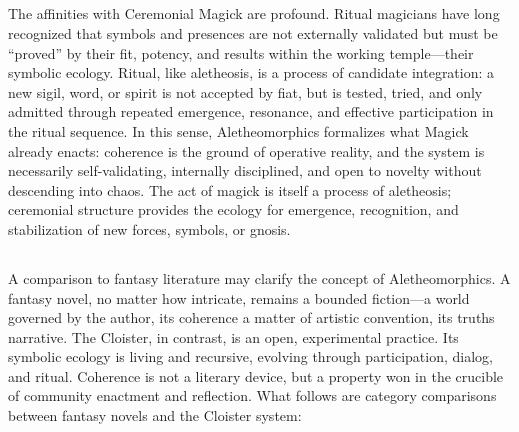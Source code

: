 \subsection*{}

The affinities with Ceremonial Magick are profound. Ritual magicians have long
recognized that symbols and presences are not externally validated but must be
“proved” by their fit, potency, and results within the working temple—their
symbolic ecology. Ritual, like aletheosis, is a process of candidate
integration: a new sigil, word, or spirit is not accepted by fiat, but is
tested, tried, and only admitted through repeated emergence, resonance, and
effective participation in the ritual sequence. In this sense, Aletheomorphics
formalizes what Magick already enacts: coherence is the ground of operative
reality, and the system is necessarily self-validating, internally disciplined,
and open to novelty without descending into chaos. The act of magick is itself
a process of aletheosis; ceremonial structure provides the ecology for
emergence, recognition, and stabilization of new forces, symbols, or gnosis.

\subsection*{}

A comparison to fantasy literature may clarify the concept of Aletheomorphics.
A fantasy novel, no matter how intricate, remains a bounded fiction—a world
governed by the author, its coherence a matter of artistic convention, its
truths narrative. The Cloister, in contrast, is an open, experimental practice.
Its symbolic ecology is living and recursive, evolving through participation,
dialog, and ritual. Coherence is not a literary device, but a property won in
the crucible of community enactment and reflection.  What follows are category
comparisons between fantasy novels and the Cloister system:

